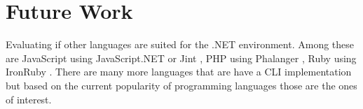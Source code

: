 \section{Future Work}

Evaluating if other languages are suited for the .NET environment. Among these are JavaScript using JavaScript.NET \cite{JavaScript.NET} or Jint \cite{Jint}, PHP using Phalanger \cite{Phalanger}, Ruby using IronRuby \cite{IronRuby}. There are many more languages that are have a CLI implementation but based on the current popularity of programming languages \cite{Tiobe} those are the ones of interest.